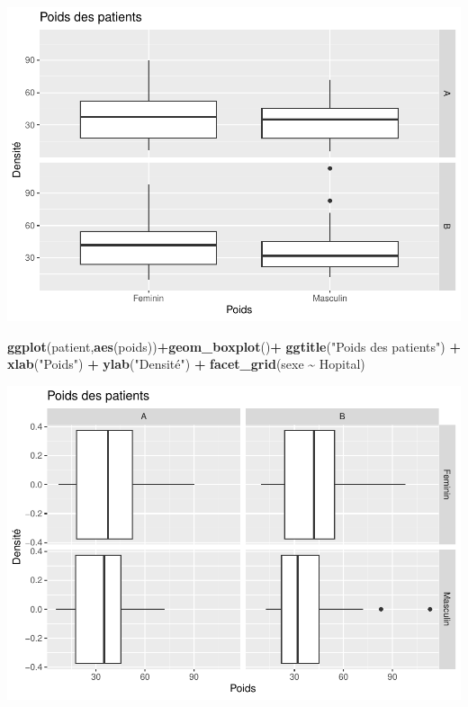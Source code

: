 \documentclass[
]{book}
\newenvironment{Shaded}{\begin{snugshade}}{\end{snugshade}}
\newcommand{\FunctionTok}[1]{\textcolor[rgb]{0.13,0.29,0.53}{\textbf{#1}}}
\newcommand{\NormalTok}[1]{#1}
\newcommand{\SpecialCharTok}[1]{\textcolor[rgb]{0.81,0.36,0.00}{\textbf{#1}}}
\newcommand{\StringTok}[1]{\textcolor[rgb]{0.31,0.60,0.02}{#1}}
\begin{document}
\includegraphics{_main_files/figure-latex/ggplot13-1.pdf}

\begin{Shaded}
\begin{Highlighting}[]
\FunctionTok{ggplot}\NormalTok{(patient,}\FunctionTok{aes}\NormalTok{(poids))}\SpecialCharTok{+}\FunctionTok{geom\_boxplot}\NormalTok{()}\SpecialCharTok{+}
  \FunctionTok{ggtitle}\NormalTok{(}\StringTok{"Poids des patients"}\NormalTok{) }\SpecialCharTok{+} 
  \FunctionTok{xlab}\NormalTok{(}\StringTok{"Poids"}\NormalTok{) }\SpecialCharTok{+} 
  \FunctionTok{ylab}\NormalTok{(}\StringTok{"Densité"}\NormalTok{) }\SpecialCharTok{+}
  \FunctionTok{facet\_grid}\NormalTok{(sexe }\SpecialCharTok{\textasciitilde{}}\NormalTok{ Hopital)}
\end{Highlighting}
\end{Shaded}

\includegraphics{_main_files/figure-latex/ggplot14-1.pdf}
\end{document}
